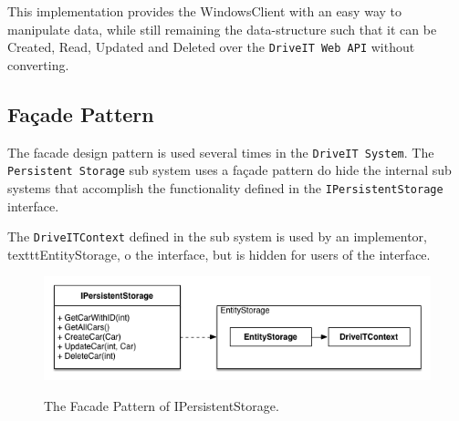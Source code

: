 This implementation provides the WindowsClient with an easy way to manipulate data, while still remaining the data-structure such that it can be Created, Read, Updated and Deleted over the \texttt{DriveIT Web API} without converting.

\subsection{Façade Pattern}
The facade design pattern is used several times in the \texttt{DriveIT System}.
The \texttt{Persistent Storage} sub system uses a façade pattern do hide the internal sub systems that accomplish the functionality defined in the \texttt{IPersistentStorage} interface.

The \texttt{DriveITContext} defined in the sub system is used by an implementor, texttt{EntityStorage}, o the interface, but is hidden for users of the interface. 

\begin{figure}[H]
	\centering
	\includegraphics[scale=0.6]{Figures/FacadePatternPersistentStorage}\\
	\caption{The Facade Pattern of IPersistentStorage.}
	\label{fig:The Facade Pattern of IPersistentStorage.}
\end{figure}